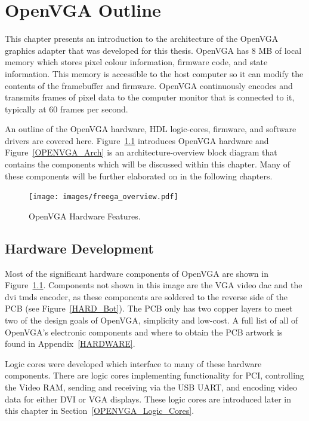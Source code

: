 \chapter{OpenVGA Outline}
\label{OPENVGA}

This chapter presents an introduction to the architecture of the OpenVGA graphics
adapter that was developed for this thesis. OpenVGA has 8 MB of local memory
which stores pixel colour information, firmware code, and state information. This
memory is accessible to the host computer so it can modify the contents of the
framebuffer and firmware. OpenVGA continuously encodes and transmits frames of
pixel data to the computer monitor that is connected to it, typically at 60
frames per second.

An outline of the OpenVGA hardware, HDL logic-cores, firmware, and software
drivers are covered here. Figure~\ref{OPENVGA_OpenVGA} introduces OpenVGA
hardware and Figure~\ref{OPENVGA_Arch} is an architecture-overview block diagram
that contains the components which will be discussed within this chapter. Many of
these components will be further elaborated on in the following chapters.

\begin{figure}[h!]
\begin{center}
\texttt{[image: images/freega\_overview.pdf]}
\caption[OpenVGA Hardware Features]{OpenVGA Hardware Features.}
\label{OPENVGA_OpenVGA}
\end{center}
\end{figure}


\section{Hardware Development}
\label{OPENVGA_Hardware}

Most of the significant hardware components of OpenVGA are shown in
Figure~\ref{OPENVGA_OpenVGA}. Components not shown in this image are the VGA
video \gls{dac} and
the \gls{dvi} \gls{tmds} encoder, as these components are soldered to the reverse side of the
PCB (see Figure~\ref{HARD_Bot}). The PCB only has two copper layers to meet two
of the design goals of OpenVGA, simplicity and low-cost. A full list of all of
OpenVGA's electronic components and where to obtain the PCB artwork is found in
Appendix~\ref{HARDWARE}.

Logic cores were developed which interface to many of these hardware components.
There are logic cores implementing functionality for PCI, controlling the Video
RAM, sending and receiving via the USB UART, and encoding video data for either
DVI or VGA displays. These logic cores are introduced later in this chapter in
Section~\ref{OPENVGA_Logic_Cores}.

